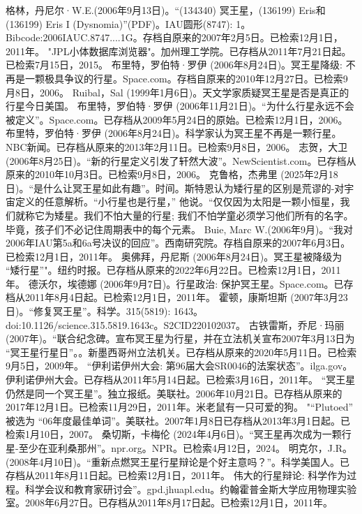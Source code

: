 \begin{enumerate}
 格林，丹尼尔·W.E.(2006年9月13日)。“(134340) 冥王星，(136199) Eris和 (136199) Eris I (Dysnomia)”(PDF)。IAU圆形(8747): 1。Bibcode:2006IAUC.8747....1G。存档自原来的2007年2月5日。已检索12月1日，2011年。
 "JPL小体数据库浏览器"。加州理工学院。已存档从2011年7月21日起。已检索7月15日，2015。
 布里特，罗伯特·罗伊 (2006年8月24日)。冥王星降级: 不再是一颗极具争议的行星。Space.com。存档自原来的2010年12月27日。已检索9月8日，2006。
 Ruibal，Sal (1999年1月6日)。天文学家质疑冥王星是否是真正的行星今日美国。
 布里特，罗伯特·罗伊 (2006年11月21日)。“为什么行星永远不会被定义”。Space.com。已存档从2009年5月24日的原始。已检索12月1日，2006。
 布里特，罗伯特·罗伊 (2006年8月24日)。科学家认为冥王星不再是一颗行星。NBC新闻。已存档从原来的2013年2月11日。已检索9月8日，2006。
 志贺，大卫 (2006年8月25日)。“新的行星定义引发了轩然大波”。NewScientist.com。已存档从原来的2010年10月3日。已检索9月8日，2006。
 克鲁格，杰弗里 (2025年2月18日)。“是什么让冥王星如此有趣”。时间。斯特恩认为矮行星的区别是荒谬的-对宇宙定义的任意解析。“小行星也是行星，” 他说。“仅仅因为太阳是一颗小恒星，我们就称它为矮星。我们不怕大量的行星; 我们不怕学童必须学习他们所有的名字。毕竟，孩子们不必记住周期表中的每个元素。
 Buie, Marc W.(2006年9月)。“我对2006年IAU第5a和6a号决议的回应”。西南研究院。存档自原来的2007年6月3日。已检索12月1日，2011年。
 奥佛拜，丹尼斯 (2006年8月24日)。冥王星被降级为 “矮行星”"。纽约时报。已存档从原来的2022年6月22日。已检索12月1日，2011年。
 德沃尔，埃德娜 (2006年9月7日)。行星政治: 保护冥王星。Space.com。已存档从2011年8月4日起。已检索12月1日，2011年。
 霍顿，康斯坦斯 (2007年3月23日)。“修复冥王星”。科学。315(5819): 1643。doi:10.1126/science.315.5819.1643c。S2CID220102037。 
 古铁雷斯，乔尼·玛丽 (2007年)。“联合纪念碑。宣布冥王星为行星，并在立法机关宣布2007年3月13日为 “冥王星行星日”。。新墨西哥州立法机关。已存档从原来的2020年5月11日。已检索9月5日，2009年。
 “伊利诺伊州大会: 第96届大会SR0046的法案状态”。ilga.gov。伊利诺伊州大会。已存档从2011年5月14日起。已检索3月16日，2011年。
 “冥王星仍然是同一个冥王星”。独立报纸。美联社。2006年10月21日。已存档从原来的2017年12月1日。已检索11月29日，2011年。米老鼠有一只可爱的狗。
 "“Plutoed” 被选为 “06年度最佳单词”。美联社。2007年1月8日已存档从2013年3月1日起。已检索1月10日，2007。
 桑切斯，卡梅伦 (2024年4月6日)。“冥王星再次成为一颗行星-至少在亚利桑那州”。npr.org。NPR。已检索4月12日，2024。
 明克尔，J.R。(2008年4月10日)。“重新点燃冥王星行星辩论是个好主意吗？”。科学美国人。已存档从2011年8月11日起。已检索12月1日，2011年。
 伟大的行星辩论: 科学作为过程。科学会议和教育家研讨会”。gpd.jhuapl.edu。约翰霍普金斯大学应用物理实验室。2008年6月27日。已存档从2011年8月17日起。已检索12月1日，2011年。

\end{enumerate}
